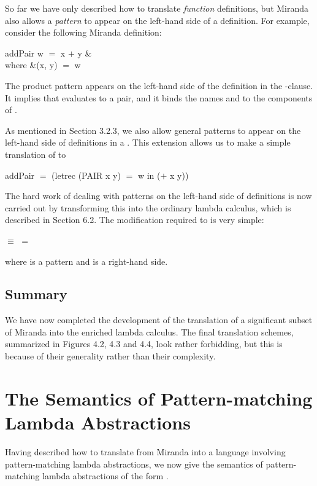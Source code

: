 So far we have only described how to translate \textit{function} definitions, but Miranda also allows a \textit{pattern} to appear on the left-hand side of a definition. For example, consider the following Miranda definition:
\begin{mlalign}
    addPair w $=$ x $+$ y & \\
    where &(x, y) $=$ w
\end{mlalign}
The product pattern  appears on the left-hand side of the definition in the -clause. It implies that  evaluates to a pair, and it binds the names  and  to the components of .

As mentioned in Section 3.2.3, we also allow general patterns to appear on the left-hand side of definitions in a . This extension allows us to make a simple translation of  to
\begin{mlcoded}
    addPair $=$ (letrec (PAIR x y) $=$ w in ($+$ x y))
\end{mlcoded}

The hard work of dealing with patterns on the left-hand side of definitions is now carried out by transforming this  into the ordinary lambda calculus, which is described in Section 6.2. The modification required to  is very simple:
\begin{mlcoded}
     $\equiv$  $=$ 
\end{mlcoded}
where  is a pattern and  is a right-hand side.

\subsection{Summary}
We have now completed the development of the translation of a significant subset of Miranda into the enriched lambda calculus. The final translation schemes, summarized in Figures 4.2, 4.3 and 4.4, look rather forbidding, but this is because of their generality rather than their complexity.

\section{The Semantics of Pattern-matching Lambda Abstractions}
Having described how to translate from Miranda into a language involving pattern-matching lambda abstractions, we now give the semantics of pattern-matching lambda abstractions of the form .

